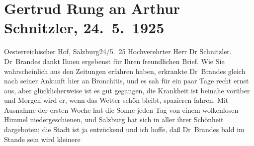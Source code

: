 

         
         \renewcommand{\erwaehntePersonen}{Personen: Georg Brandes, Gertrud Rung}
         \renewcommand{\erwaehnteOrte}{Orte: Kopenhagen, Salzburg, Wien, Österreichischer Hof}
         \renewcommand{\erwaehnteWerke}{}
               \section[Gertrud Rung an Arthur Schnitzler, 24. 5. 1925]{ Gertrud Rung an Arthur Schnitzler, 24. 5. 1925}\nopagebreak{}\rehead{ }\begin{ledgroupsized}[t]{13cm}\normalsize\beginnumbering \toendnotes[C]{\smallbreak\pagebreak[2]} 
\pstart
           \raggedleft{}{\pb}Oesterreichischer Hof, Salzburg24/5. 25\pend
           \pstart{}Hochverehrter Herr Dr Schnitzler.\pend\pstart
           Dr Brandes dankt Ihnen ergebenst für Ihren
               freundlichen Brief. Wie Sie wahrscheinlich aus den Zeitungen erfahren haben,
               erkrankte Dr Brandes gleich nach seiner
               Ankunft hier an Bronchitis, und es sah für ein paar Tage recht ernst aus, aber
               glücklicherweise ist es gut gegangen, die Krankheit ist beinahe vorüber und Morgen
                  {\pb}wird er, wenn das Wetter schön
               bleibt, spazieren fahren.\pend
           \pstart
           Mit Ausnahme der ersten Woche hat die Sonne jeden Tag von einem wolkenlosen Himmel
               niedergeschienen, und Salzburg hat sich in aller
               ihrer Schönheit dargeboten; die Stadt ist ja entzückend und ich hoffe, daß Dr Brandes bald im Stande sein wird kleinere

\end{ledgroupsized}
